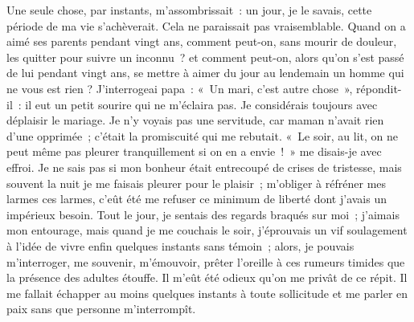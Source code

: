 {Une seule chose, par instants, m'assombrissait~: un jour, je le
savais, cette période de ma vie s'achèverait. Cela ne paraissait pas
vraisemblable. Quand on a aimé ses parents pendant vingt ans, comment
peut-on, sans mourir de douleur, les quitter pour suivre un inconnu~?
et comment peut-on, alors qu'on s'est passé de lui pendant vingt ans,
se mettre à aimer du jour au lendemain un homme qui ne vous est rien
? J'interrogeai papa~: «~Un mari, c'est autre chose~», répondit-il~:
il eut un petit sourire qui ne m'éclaira pas. Je considérais toujours
avec déplaisir le mariage. Je n'y voyais pas une servitude, car maman
n'avait rien d'une opprimée~; c'était la promiscuité qui me rebutait.
«~Le soir, au lit, on ne peut même pas pleurer tranquillement si on
en a envie~!~» me disais-je avec effroi. Je ne sais pas si mon
bonheur était entrecoupé de crises de tristesse, mais souvent la nuit
je me faisais pleurer pour le plaisir~; m'obliger à réfréner mes
larmes ces larmes, c'eût été me refuser ce minimum de liberté dont
j'avais un impérieux besoin. Tout le jour, je sentais des regards
braqués sur moi~; j'aimais mon entourage, mais quand je me couchais
le soir, j'éprouvais un vif soulagement à l'idée de vivre enfin
quelques instants sans témoin~; alors, je pouvais m'interroger, me
souvenir, m'émouvoir, prêter l'oreille à ces rumeurs timides que la
présence des adultes étouffe. Il m'eût été odieux qu'on me privât de
ce répit. Il me fallait échapper au moins quelques instants à toute
sollicitude et me parler en paix sans que personne m'interrompît.
}


